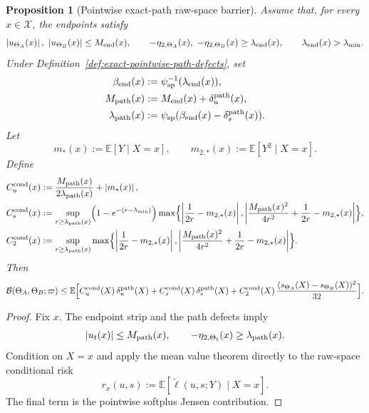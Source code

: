 \documentclass[11pt]{article}
\newtheorem{proposition}[theorem]{Proposition}
\theoremstyle{definition}
\newcommand{\E}{\mathbb{E}}
\newcommand{\abs}[1]{\left\lvert #1 \right\rvert}
\newcommand{\mc}[1]{\mathcal{#1}}
\newcommand{\cB}{\mathcal{B}}
\begin{document}
\begin{proposition}[Pointwise exact-path raw-space barrier]
\label{prop:xdependent-exact-path-rawspace}
Assume that, for every $x\in\mc{X}$, the endpoints satisfy
\[
  \abs{u_{\Theta_A}(x)},\ \abs{u_{\Theta_B}(x)}\le M_{\rm end}(x),
  \qquad
  -\eta_{2,\Theta_A}(x),\ -\eta_{2,\Theta_B}(x)\ge \lambda_{\rm end}(x),
  \qquad
  \lambda_{\rm end}(x)>\lambda_{\min}.
\]
Under Definition~\ref{def:exact-pointwise-path-defects}, set
\begin{align*}
  \beta_{\rm end}(x)
  &:=
  \psi_{\rm sp}^{-1}(\lambda_{\rm end}(x)),
  \\
  M_{\rm path}(x)
  &:=
  M_{\rm end}(x)+\delta_u^{\rm path}(x),
  \\
  \lambda_{\rm path}(x)
  &:=
  \psi_{\rm sp}(\beta_{\rm end}(x)-\delta_s^{\rm path}(x)).
\end{align*}
Let
\[
  m_\ast(x):=\E[Y\mid X=x],
  \qquad
  m_{2,\ast}(x):=\E[Y^2\mid X=x].
\]
Define
\begin{align}
  C_u^{\rm cond}(x)
  &:=
  \frac{M_{\rm path}(x)}{2\lambda_{\rm path}(x)}+\abs{m_\ast(x)},
  \label{eq:Cu-cond}
  \\
  C_s^{\rm cond}(x)
  &:=
  \sup_{r\ge \lambda_{\rm path}(x)}
  \Bigl(1-e^{-(r-\lambda_{\min})}\Bigr)
  \max\Bigl\{
    \abs{\frac{1}{2r}-m_{2,\ast}(x)},
    \abs{\frac{M_{\rm path}(x)^2}{4r^2}+\frac{1}{2r}-m_{2,\ast}(x)}
  \Bigr\},
  \label{eq:Cs-cond}
  \\
  C_2^{\rm cond}(x)
  &:=
  \sup_{r\ge \lambda_{\rm path}(x)}
  \max\Bigl\{
    \abs{\frac{1}{2r}-m_{2,\ast}(x)},
    \abs{\frac{M_{\rm path}(x)^2}{4r^2}+\frac{1}{2r}-m_{2,\ast}(x)}
  \Bigr\}.
  \label{eq:C2-cond}
\end{align}
Then
\begin{equation}
  \cB(\Theta_A,\Theta_B;\varpi)
  \le
  \E\Bigl[
    C_u^{\rm cond}(X)\,\delta_u^{\rm path}(X)
    +
    C_s^{\rm cond}(X)\,\delta_s^{\rm path}(X)
    +
    C_2^{\rm cond}(X)\,\frac{(s_{\Theta_A}(X)-s_{\Theta_B}(X))^2}{32}
  \Bigr].
  \label{eq:xdependent-exact-path-rawspace}
\end{equation}
\end{proposition}

\begin{proof}
Fix $x$. The endpoint strip and the path defects imply
\[
  \abs{u_t(x)}\le M_{\rm path}(x),
  \qquad
  -\eta_{2,\Theta_t}(x)\ge \lambda_{\rm path}(x).
\]
Condition on $X=x$ and apply the mean value theorem directly to the raw-space
conditional risk
\[
  r_x(u,s):=\E[\tilde\ell(u,s;Y)\mid X=x].
\]
The final term is the pointwise softplus Jensen contribution.
\end{proof}
\end{document}

